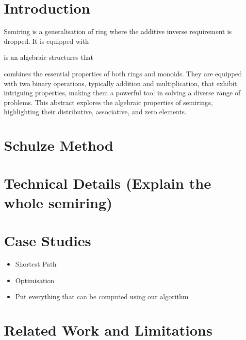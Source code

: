 \documentclass[runningheads]{llncs}
\begin{document}
\section{Introduction}

Semiring is a generalisation of ring where the additive inverse requirement is dropped. 
It is equipped with 

is an algebraic structures that 


combines the essential properties of both rings and monoids. 
They are equipped with two binary operations, typically addition and multiplication, that exhibit 
intriguing properties, making them a powerful tool in solving a diverse range of problems. 
This abstract explores the algebraic properties of semirings, highlighting their distributive, associative, and zero elements.

\section{Schulze Method}

\section{Technical Details (Explain the whole semiring)}

\section{Case Studies}
  \begin{itemize}
    \item Shortest Path
    \item Optimisation 
    \item Put everything that can be computed using our algorithm
  \end{itemize}

\section{Related Work and Limitations}
%
%
%
%
%
%


%
\end{document}
